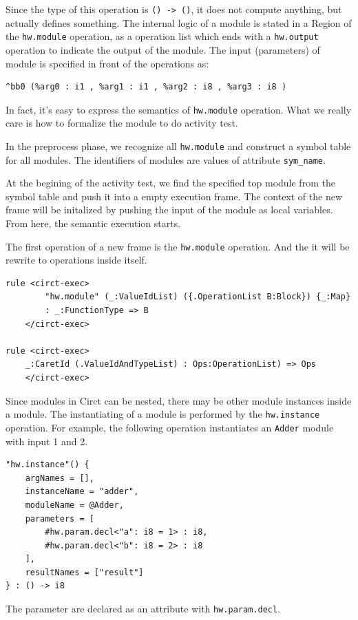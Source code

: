 Since the type of this operation is \verb|() -> ()|, it does not compute anything, but actually defines something. The internal logic of a module is stated in a Region of the \verb|hw.module| operation, as a operation list which ends with a \verb|hw.output| operation to indicate the output of the module. The input (parameters) of module is specified in front of the operations as:
\begin{lstlisting}
^bb0 (%arg0 : i1 , %arg1 : i1 , %arg2 : i8 , %arg3 : i8 )
\end{lstlisting}

In fact, it's easy to express the semantics of \verb|hw.module| operation. What we really care is how to formalize the module to do activity test.

In the preprocess phase, we recognize all \verb|hw.module| and construct a symbol table for all modules. The identifiers of modules are values of attribute \verb|sym_name|.

At the begining of the activity test, we find the specified top module from the symbol table and push it into a empty execution frame. The context of the new frame will be initalized by pushing the input of the module as local variables. From here, the semantic execution starts.

The first operation of a new frame is the \verb|hw.module| operation. And the it will be rewrite to operations inside itself.

\begin{lstlisting}
rule <circt-exec> 
        "hw.module" (_:ValueIdList) ({.OperationList B:Block}) {_:Map} 
        : _:FunctionType => B
    </circt-exec>

rule <circt-exec> 
    _:CaretId (.ValueIdAndTypeList) : Ops:OperationList) => Ops
    </circt-exec>
\end{lstlisting}

Since modules in Circt can be nested, there may be other module instances inside a module. The instantiating of a module is performed by the \verb|hw.instance| operation. For example, the following operation instantiates an \verb|Adder| module with input 1 and 2.
\begin{lstlisting}
"hw.instance"() {
    argNames = [],
    instanceName = "adder",
    moduleName = @Adder,
    parameters = [
        #hw.param.decl<"a": i8 = 1> : i8,
        #hw.param.decl<"b": i8 = 2> : i8
    ],
    resultNames = ["result"]
} : () -> i8
\end{lstlisting}
The parameter are declared as an attribute with \verb|hw.param.decl|.

